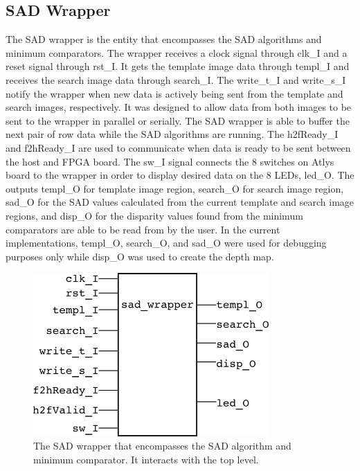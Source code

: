 \subsection{SAD Wrapper}

The SAD wrapper is the entity that encompasses the SAD algorithms and minimum comparators. The wrapper receives a clock signal through clk\_I and a reset signal through rst\_I. It gets the template image data through templ\_I and receives the search image data through search\_I. The write\_t\_I and write\_s\_I notify the wrapper when new data is actively being sent from the template and search images, respectively. It was designed to allow data from both images to be sent to the wrapper in parallel or serially. The SAD wrapper is able to buffer the next pair of row data while the SAD algorithms are running. The h2fReady\_I and f2hReady\_I are used to communicate when data is ready to be sent between the host and FPGA board. The sw\_I signal connects the 8 switches on Atlys board to the wrapper in order to display desired data on the 8 LEDs, led\_O. The outputs templ\_O for template image region, search\_O for search image region, sad\_O for the SAD values calculated from the current template and search image regions, and disp\_O for the disparity values found from the minimum comparators are able to be read from by the user. In the current implementations, templ\_O, search\_O, and sad\_O were used for debugging purposes only while disp\_O was used to create the depth map. %

\begin{figure}
	\begin{center}
		\includegraphics[width=90mm]{figures/sad_wrapper_rtl.png}
		\captionfonts
		\caption{The SAD wrapper that encompasses the SAD algorithm and minimum comparator. It interacts with the top level.}
		\label{fig:sadWrapper_rtl}
	\end{center}
\end{figure}

